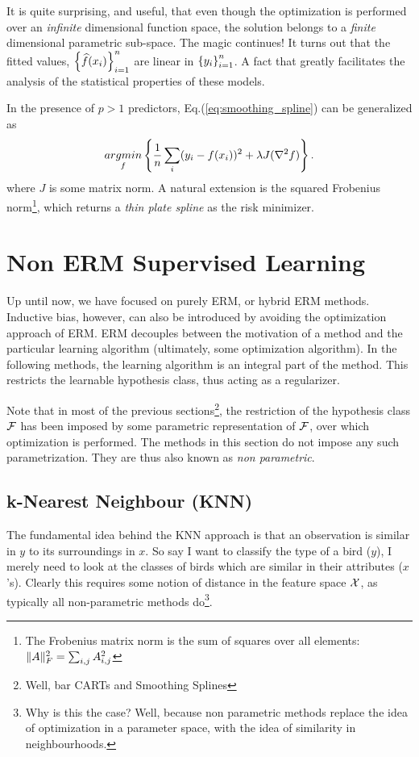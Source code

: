 It is quite surprising, and useful, that even though the optimization is performed over an \emph{infinite} dimensional function space, the solution belongs to a \emph{finite } dimensional parametric sub-space. 
The magic continues! It turns out that the fitted values, $\left\{ \widehat{f}(x_i) \right\}_{i=1}^n$ are linear in $\left\{ y_i \right\}_{i=1}^n$. A fact that greatly facilitates the analysis of the statistical properties of these models.

In the presence of $p>1$ predictors, Eq.(\ref{eq:smoothing_spline}) can be generalized as 
\begin{align}
\label{eq:smoothing_spline_multi}
	 \mathop{argmin} _{f}\left\{ \frac{1}{n}\sum_i (y_i-f(x_i))^2 + \lambda J(\nabla^2 f)   \right\}.
\end{align}
where $J$ is some matrix norm. A natural extension is the squared Frobenius norm\footnote{The Frobenius matrix norm is the sum of squares over all elements: $\Vert A \Vert^2_F=\sum_{i,j} A_{i,j}^2$ }, which returns a \emph{thin plate spline} as the risk minimizer.




\section{Non ERM Supervised Learning}
\label{sec:non_erm}
Up until now, we have focused on purely ERM, or hybrid ERM methods.
Inductive bias, however, can also be introduced by avoiding the optimization approach of ERM.
ERM decouples between the motivation of a method and the particular learning algorithm (ultimately, some optimization algorithm).
In the following methods, the learning algorithm is an integral part of the method. 
This restricts the learnable hypothesis class, thus acting as a regularizer.

Note that in most of the previous sections\footnote{Well, bar CARTs and Smoothing Splines}, the restriction of the hypothesis class $\mathcal{F}$ has been imposed by some parametric representation of $\mathcal{F}$, over which optimization is performed.
The methods in this section do not impose any such parametrization. They are thus also known as \emph{non parametric}.

 

\subsection{k-Nearest Neighbour (KNN)}
\label{sec:knn}
The fundamental idea behind the KNN approach is that an observation is similar in $y$ to its surroundings in $x$. 
So say I want to classify the type of a bird ($y$), I merely need to look at the classes of birds which are similar in their attributes ($x$'s). 
Clearly this requires some notion of distance in the feature space $\mathcal{X}$, as typically all non-parametric methods do\footnote{Why is this the case? Well, because non parametric methods replace the idea of optimization in a parameter space, with the idea of similarity in neighbourhoods.}.

